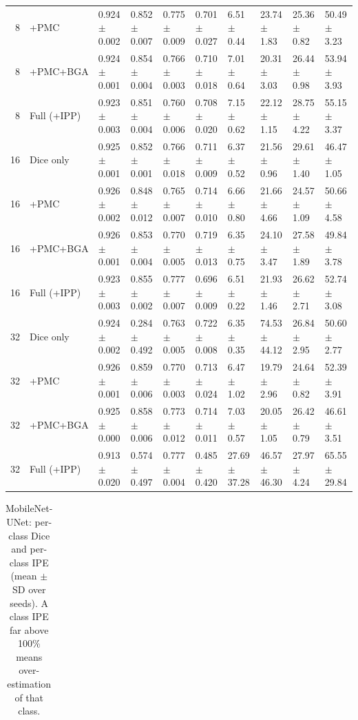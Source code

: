 \documentclass[10pt]{article}
\begin{document}
\begin{landscape}
{\begin{longtable}{r l l l l l l l l l}
8 & +PMC & 0.924 $\pm$ 0.002 & 0.852 $\pm$ 0.007 & 0.775 $\pm$ 0.009 & 0.701 $\pm$ 0.027 & 6.51 $\pm$ 0.44 & 23.74 $\pm$ 1.83 & 25.36 $\pm$ 0.82 & 50.49 $\pm$ 3.23 \\
8 & +PMC+BGA & 0.924 $\pm$ 0.001 & 0.854 $\pm$ 0.004 & 0.766 $\pm$ 0.003 & 0.710 $\pm$ 0.018 & 7.01 $\pm$ 0.64 & 20.31 $\pm$ 3.03 & 26.44 $\pm$ 0.98 & 53.94 $\pm$ 3.93 \\
8 & Full (+IPP) & 0.923 $\pm$ 0.003 & 0.851 $\pm$ 0.004 & 0.760 $\pm$ 0.006 & 0.708 $\pm$ 0.020 & 7.15 $\pm$ 0.62 & 22.12 $\pm$ 1.15 & 28.75 $\pm$ 4.22 & 55.15 $\pm$ 3.37 \\
16 & Dice only & 0.925 $\pm$ 0.001 & 0.852 $\pm$ 0.001 & 0.766 $\pm$ 0.018 & 0.711 $\pm$ 0.009 & 6.37 $\pm$ 0.52 & 21.56 $\pm$ 0.96 & 29.61 $\pm$ 1.40 & 46.47 $\pm$ 1.05 \\
16 & +PMC & 0.926 $\pm$ 0.002 & 0.848 $\pm$ 0.012 & 0.765 $\pm$ 0.007 & 0.714 $\pm$ 0.010 & 6.66 $\pm$ 0.80 & 21.66 $\pm$ 4.66 & 24.57 $\pm$ 1.09 & 50.66 $\pm$ 4.58 \\
16 & +PMC+BGA & 0.926 $\pm$ 0.001 & 0.853 $\pm$ 0.004 & 0.770 $\pm$ 0.005 & 0.719 $\pm$ 0.013 & 6.35 $\pm$ 0.75 & 24.10 $\pm$ 3.47 & 27.58 $\pm$ 1.89 & 49.84 $\pm$ 3.78 \\
16 & Full (+IPP) & 0.923 $\pm$ 0.003 & 0.855 $\pm$ 0.002 & 0.777 $\pm$ 0.007 & 0.696 $\pm$ 0.009 & 6.51 $\pm$ 0.22 & 21.93 $\pm$ 1.46 & 26.62 $\pm$ 2.71 & 52.74 $\pm$ 3.08 \\
32 & Dice only & 0.924 $\pm$ 0.002 & 0.284 $\pm$ 0.492 & 0.763 $\pm$ 0.005 & 0.722 $\pm$ 0.008 & 6.35 $\pm$ 0.35 & 74.53 $\pm$ 44.12 & 26.84 $\pm$ 2.95 & 50.60 $\pm$ 2.77 \\
32 & +PMC & 0.926 $\pm$ 0.001 & 0.859 $\pm$ 0.006 & 0.770 $\pm$ 0.003 & 0.713 $\pm$ 0.024 & 6.47 $\pm$ 1.02 & 19.79 $\pm$ 2.96 & 24.64 $\pm$ 0.82 & 52.39 $\pm$ 3.91 \\
32 & +PMC+BGA & 0.925 $\pm$ 0.000 & 0.858 $\pm$ 0.006 & 0.773 $\pm$ 0.012 & 0.714 $\pm$ 0.011 & 7.03 $\pm$ 0.57 & 20.05 $\pm$ 1.05 & 26.42 $\pm$ 0.79 & 46.61 $\pm$ 3.51 \\
32 & Full (+IPP) & 0.913 $\pm$ 0.020 & 0.574 $\pm$ 0.497 & 0.777 $\pm$ 0.004 & 0.485 $\pm$ 0.420 & 27.69 $\pm$ 37.28 & 46.57 $\pm$ 46.30 & 27.97 $\pm$ 4.24 & 65.55 $\pm$ 29.84 \\
\end{longtable}
}
{\scriptsize
\begin{longtable}{r l l l l l l l l l}
\caption{MobileNet-UNet: per-class Dice and per-class IPE (mean $\pm$ SD over seeds). A class IPE far above 100\% means over-estimation of that class.}\label{tab:cls_mobilenet_unet}\\

\end{longtable}}
\end{landscape}
\end{document}
